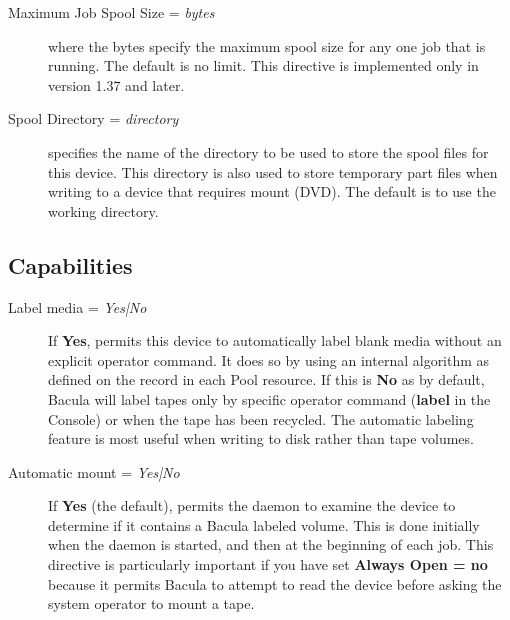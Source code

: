 \begin{description}
\item [Maximum Job Spool Size = {\it bytes}]
   where the bytes specify the maximum spool size for any one job  that is
   running. The default is no limit. 
   This directive is implemented only in version 1.37 and later.

\item [Spool Directory = {\it directory}]
   specifies the name of the directory to be used to store  the spool files for
this device. This directory is also used to store  temporary part files when
writing to a device that requires mount (DVD).  The default is to use the
working directory. 



\end{description}



\subsection*{Capabilities}

\begin{description}

\item [Label media = {\it Yes|No}]
   If {\bf Yes}, permits this device to automatically  label blank media without
   an explicit operator command.  It does so by using an internal algorithm as
   defined  on the 
    record in each Pool resource.  If
   this is {\bf No} as by default,  Bacula will label tapes only by specific
   operator  command ({\bf label} in the Console) or when the tape has been
   recycled.  The automatic labeling feature is most useful when writing to disk 
   rather than tape volumes.  

\item [Automatic mount = {\it Yes|No}]
   If {\bf Yes} (the default), permits the daemon to examine the  device to
   determine if it contains a Bacula labeled  volume. This is done initially when
   the daemon is started,  and then at the beginning of each job. This directive
   is particularly  important if you have set {\bf Always Open = no} because it 
   permits Bacula to attempt to read the device before asking  the system
   operator to mount a tape.  

\end{description}

